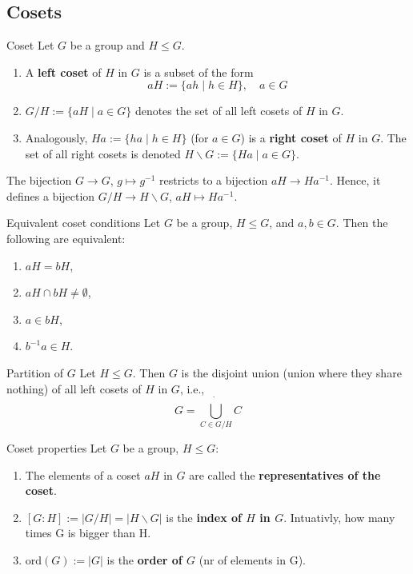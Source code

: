 \documentclass[a4paper]{article}
\begin{document}
\subsection{Cosets}

\begin{defi}{Coset}
Let $G$ be a group and $H \le G$.
\begin{enumerate}[label=(\alph*)]
    \item A \textbf{left coset} of $H$ in $G$ is a subset of the form 
    $$aH := \{ah \mid h \in H\}, \quad a \in G$$
    \item $G/H := \{aH \mid a \in G\}$ denotes the set of all left cosets of $H$ in $G$.
    \item Analogously, $Ha := \{ha \mid h \in H\}$ (for $a \in G$) is a \textbf{right coset} of $H$ in $G$. The set of all right cosets is denoted $H \backslash G := \{Ha \mid a \in G\}$.
\end{enumerate}
\end{defi}

\begin{add}
The bijection $G \to G$, $g \mapsto g^{-1}$ restricts to a bijection $aH \to Ha^{-1}$. Hence, it defines a bijection $G/H \to H \backslash G$, $aH \mapsto Ha^{-1}$.
\end{add}

\begin{ther}{Equivalent coset conditions}
Let $G$ be a group, $H \le G$, and $a,b \in G$. Then the following are equivalent:
\begin{enumerate}[label=(\roman*)]
    \item $aH = bH$,
    \item $aH \cap bH \neq \emptyset$,
    \item $a \in bH$,
    \item $b^{-1}a \in H$.
\end{enumerate}
\end{ther}

\begin{ther}{Partition of $G$}
Let $H \le G$. Then $G$ is the disjoint union (union where they share nothing) of all left cosets of $H$ in $G$, i.e.,
$$G = \dot{\bigcup_{C \in G/H}} C$$
\end{ther}

\begin{defi}{Coset properties}
Let $G$ be a group, $H \le G$:
\begin{enumerate}[label=(\alph*)]
    \item The elements of a coset $aH$ in $G$ are called the \textbf{representatives of the coset}. 
    \item $[G : H] := |G/H| = |H \backslash G|$ is the \textbf{index of $H$ in $G$}. Intuativly, how many times G is bigger than H. 
    \item $\text{ord}(G) := |G|$ is the \textbf{order of $G$} (nr of elements in G).
\end{enumerate}
\end{defi}
\end{document}
